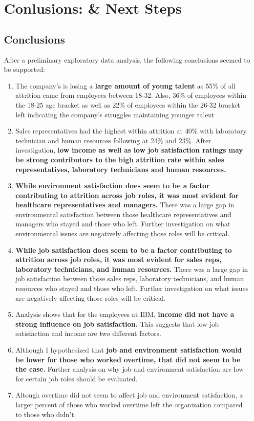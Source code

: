 \documentclass[
]{article}
\begin{document}
\hypertarget{conlusions-next-steps}{%
\section{Conlusions: \& Next Steps}\label{conlusions-next-steps}}

\hypertarget{conclusions}{%
\subsection{Conclusions}\label{conclusions}}

After a preliminary exploratory data analysis, the following conclusions
seemed to be supported:

\begin{enumerate}
\def\labelenumi{\arabic{enumi}.}
\item
  The company's is losing a \textbf{large amount of young talent} as
  55\% of all attrition came from employees between 18-32. Also, 36\% of
  employees within the 18-25 age bracket as well as 22\% of employees
  within the 26-32 bracket left indicating the company's struggles
  maintaining younger talent
\item
  Sales representatives had the highest within attrition at 40\% with
  laboratory technician and human resources following at 24\% and 23\%.
  After investigation, \textbf{low income as well as low job
  satisfaction ratings may be strong contributors to the high attrition
  rate within sales representatives, laboratory technicians and human
  resources.}
\item
  \textbf{While environment satisfaction does seem to be a factor
  contributing to attrition across job roles, it was most evident for
  healthcare representatives and managers.} There was a large gap in
  environmental satisfaction between those healthcare representatives
  and managers who stayed and those who left. Further investigation on
  what environmental issues are negatively affecting those roles will be
  critical.
\item
  \textbf{While job satisfaction does seem to be a factor contributing
  to attrition across job roles, it was most evident for sales reps,
  laboratory technicians, and human resources.} There was a large gap in
  job satisfaction between those sales reps, laboratory technicians, and
  human resources who stayed and those who left. Further investigation
  on what issues are negatively affecting those roles will be critical.
\item
  Analysis shows that for the employees at IBM, \textbf{income did not
  have a strong influence on job satisfaction.} This suggests that low
  job satisfaction and income are two different factors.
\item
  Although I hypothesized that \textbf{job and environment satisfaction
  would be lower for those who worked overtime, that did not seem to be
  the case.} Further analysis on why job and environment satisfaction
  are low for certain job roles should be evaluated.
\item
  Altough overtime did not seem to affect job and environment
  satisfaction, a larger percent of those who worked overtime left the
  organization compared to those who didn't.
\end{enumerate}
\end{document}
